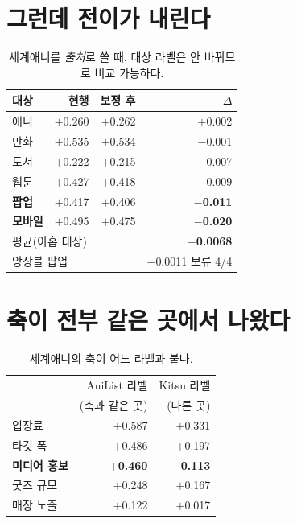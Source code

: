 \documentclass[10pt]{article}
\begin{document}
\section{그런데 전이가 내린다}

\begin{table}[t]
\centering\tsize
\caption{세계애니를 \emph{출처}로 쓸 때. 대상 라벨은 안 바뀌므로 비교 가능하다.}
\begin{tabular}{lrrr}
\toprule
대상 & 현행 & 보정 후 & $\Delta$ \\
\midrule
애니 & $+$0.260 & $+$0.262 & $+$0.002 \\
만화 & $+$0.535 & $+$0.534 & $-$0.001 \\
도서 & $+$0.222 & $+$0.215 & $-$0.007 \\
웹툰 & $+$0.427 & $+$0.418 & $-$0.009 \\
\textbf{팝업} & $+$0.417 & $+$0.406 & \textbf{$-$0.011} \\
\textbf{모바일} & $+$0.495 & $+$0.475 & \textbf{$-$0.020} \\
\midrule
\multicolumn{3}{l}{평균(아홉 대상)} & \textbf{$-$0.0068} \\
\multicolumn{3}{l}{앙상블 팝업} & $-$0.0011 \quad 보류 4/4 \\
\bottomrule
\end{tabular}
\end{table}


\section{축이 전부 같은 곳에서 나왔다}

\begin{table}[t]
\centering\tsize
\caption{세계애니의 축이 어느 라벨과 붙나.}
\begin{tabular}{lrr}
\toprule
& AniList 라벨 & Kitsu 라벨 \\
& (축과 같은 곳) & (다른 곳) \\
\midrule
입장료 & $+$0.587 & $+$0.331 \\
타깃 폭 & $+$0.486 & $+$0.197 \\
\textbf{미디어 홍보} & \textbf{$+$0.460} & \textbf{$-$0.113} \\
굿즈 규모 & $+$0.248 & $+$0.167 \\
매장 노출 & $+$0.122 & $+$0.017 \\
\bottomrule
\end{tabular}
\end{table}
\end{document}
